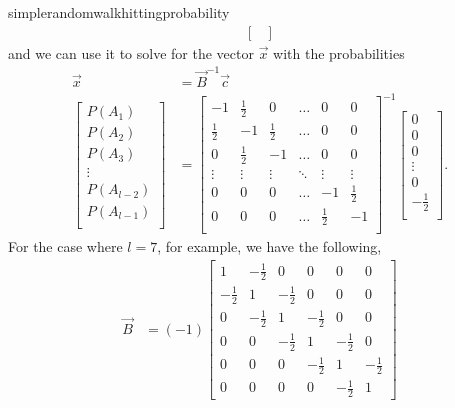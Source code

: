 \begin{answer}{simplerandomwalkhittingprobability}
\begin{align*}
\begin{bmatrix}
  \end{bmatrix}
\end{align*}
and we can use it to solve for the vector $\vec{x}$ with the probabilities
\begin{align*}
\vec{x} &= \vec{B}^{-1}\vec{c} \\
  \begin{bmatrix}
  P(A_1) \\
  P(A_2) \\
  P(A_3) \\
  \vdots \\
  P(A_{l-2}) \\
  P(A_{l-1}) \\
  \end{bmatrix}
  &=
  \begin{bmatrix}
 -1           & \frac{1}{2}  & 0            &   \ldots       & 0            & 0            \\
 \frac{1}{2}  & -1           & \frac{1}{2}  &   \ldots       & 0            & 0            \\
 0            & \frac{1}{2}  & -1           &   \ldots       & 0            & 0            \\
  \vdots      & \vdots       & \vdots       &   \ddots       & \vdots       & \vdots       \\
 0            & 0            & 0            &   \ldots       & -1           & \frac{1}{2}  \\
 0            & 0            & 0            &   \ldots       & \frac{1}{2}  & -1           \\
  \end{bmatrix}^{-1}
  \begin{bmatrix}
    0 \\ 0 \\ 0 \\ \vdots \\ 0 \\ -\frac{1}{2} \\
  \end{bmatrix}
\text{.}
\end{align*}
For the case where $l=7$, for example, we have the following,
\begin{align*}
\vec{B} &=
(-1)
\left[\begin{matrix}1 & - \frac{1}{2} & 0 & 0 & 0 & 0\\- \frac{1}{2} & 1 & - \frac{1}{2} & 0 & 0 & 0\\0 & - \frac{1}{2} & 1 & - \frac{1}{2} & 0 & 0\\0 & 0 & - \frac{1}{2} & 1 & - \frac{1}{2} & 0\\0 & 0 & 0 & - \frac{1}{2} & 1 & - \frac{1}{2}\\0 & 0 & 0 & 0 & - \frac{1}{2} & 1\end{matrix}\right]

\end{align*}
\end{answer}
